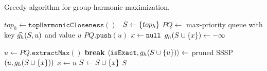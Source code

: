 \begin{algorithm}[tb]
\footnotesize
\caption{\footnotesize Greedy algorithm for group-harmonic maximization.}
\label{algo:gh-greedy-eng}
\begin{algorithmic}[1]
\State$top_h \gets \texttt{topHarmonicCloseness}()$~\cite{DBLP:conf/alenex/BiseniusBAM18}
\label{line:gh-greedy-eng:toph}
\State$S \gets \set{top_h}$
\State$PQ \gets$ max-priority queue with key $\widehat{g_h}(S, u)$ and value $u$
\label{line:gh-greedy-eng:lg-1}
\State$PQ.\texttt{push}(u)$
\EndFor
\State$x \gets \texttt{null}$
\State$\gharm(S\cup\set{x}) \gets -\infty$\smallskip

\Repeat{}
\State$u \gets PQ.\texttt{extractMax}()$
\State\textbf{break}
\EndIf
\State$\left<\isexact, \gharm(S \cup \set{u})\right> \gets$
pruned SSSP$(u, \gharm(S \cup\set{x}))$
\label{line:gh-greedy-eng:pruned-sssp}
\State$x \gets u$
\EndIf
{}
\State$S \gets S \cup \set{x}$
\label{line:gh-greedy-eng:lg-2}
\EndWhile
\State\Return$S$
\end{algorithmic}
\end{algorithm}
